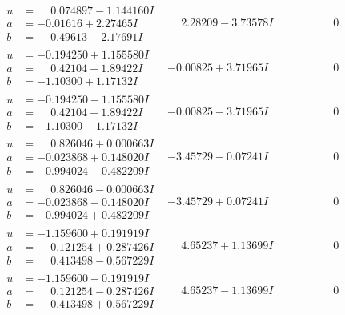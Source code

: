 \documentclass[1p]{elsarticle_modified}
\theoremstyle{definition}
\begin{document}
$$\begin{array}{c|c|c}
\begin{aligned}
u &= \phantom{-}0.074897 - 1.144160 I \\
a &= -0.01616 + 2.27465 I \\
b &= \phantom{-}0.49613 - 2.17691 I\end{aligned}
 & \phantom{-}2.28209 - 3.73578 I & \phantom{-0.000000 } 0 \\ \hline\begin{aligned}
u &= -0.194250 + 1.155580 I \\
a &= \phantom{-}0.42104 - 1.89422 I \\
b &= -1.10300 + 1.17132 I\end{aligned}
 & -0.00825 + 3.71965 I & \phantom{-0.000000 } 0 \\ \hline\begin{aligned}
u &= -0.194250 - 1.155580 I \\
a &= \phantom{-}0.42104 + 1.89422 I \\
b &= -1.10300 - 1.17132 I\end{aligned}
 & -0.00825 - 3.71965 I & \phantom{-0.000000 } 0 \\ \hline\begin{aligned}
u &= \phantom{-}0.826046 + 0.000663 I \\
a &= -0.023868 + 0.148020 I \\
b &= -0.994024 - 0.482209 I\end{aligned}
 & -3.45729 - 0.07241 I & \phantom{-0.000000 } 0 \\ \hline\begin{aligned}
u &= \phantom{-}0.826046 - 0.000663 I \\
a &= -0.023868 - 0.148020 I \\
b &= -0.994024 + 0.482209 I\end{aligned}
 & -3.45729 + 0.07241 I & \phantom{-0.000000 } 0 \\ \hline\begin{aligned}
u &= -1.159600 + 0.191919 I \\
a &= \phantom{-}0.121254 + 0.287426 I \\
b &= \phantom{-}0.413498 - 0.567229 I\end{aligned}
 & \phantom{-}4.65237 + 1.13699 I & \phantom{-0.000000 } 0 \\ \hline\begin{aligned}
u &= -1.159600 - 0.191919 I \\
a &= \phantom{-}0.121254 - 0.287426 I \\
b &= \phantom{-}0.413498 + 0.567229 I\end{aligned}
 & \phantom{-}4.65237 - 1.13699 I & \phantom{-0.000000 } 0 \\ \hline\begin{aligned}

\end{aligned}
\end{array}$$
\end{document}
